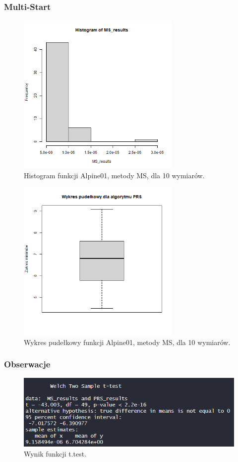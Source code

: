 \documentclass{lab}
\begin{document}
\subsubsection{Multi-Start}
\begin{figure}[H]
  \centering
  \includegraphics[width=0.7\textwidth]{img/dim10_MS_Alpine01_his.png}
  \caption{Histogram funkcji Alpine01, metody MS, dla 10 wymiarów.}
\end{figure}
\begin{figure}[H]
  \centering
  \includegraphics[width=0.7\textwidth]{img/dim10_MS_Alpine01.png}
  \caption{Wykres pudełkowy funkcji Alpine01, metody MS, dla 10 wymiarów.}
\end{figure}

\subsubsection{Obserwacje}
 \begin{figure}[H]
     \centering
     \includegraphics[width=0.9\linewidth]{img/T3.png}
     \caption{Wynik funkcji t.test.}
     \label{fig:enter-label}
 \end{figure}
\end{document}
